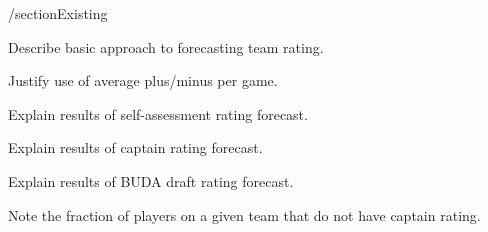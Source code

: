 /section{Existing}%

Describe basic approach to forecasting team rating.

Justify use of average plus/minus per game.

Explain results of self-assessment rating forecast.

Explain results of captain rating forecast.

Explain results of BUDA draft rating forecast.

Note the fraction of players on a given team that do not have captain rating.